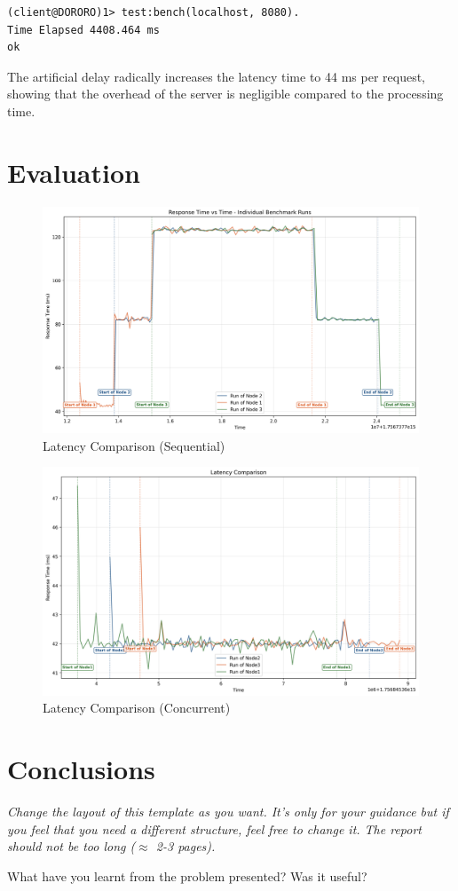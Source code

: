 \documentclass[a4paper, 11pt]{article}
\begin{document}
\begin{lstlisting}[style=erlang, caption={Benchmarking the sequential server with processing delay}]
(client@DORORO)1> test:bench(localhost, 8080).
Time Elapsed 4408.464 ms
ok
\end{lstlisting}

The artificial delay radically increases the latency time to 44 ms per request, showing that the overhead of the server is negligible compared to the processing time.

\section{Evaluation}

\begin{figure}[h]
  \centering
  \includegraphics[width=0.9\linewidth]{sequential_benches/latency_plot.png}
  \caption{Latency Comparison (Sequential)}
  \label{fig:latency_comparison_seq}
\end{figure}

\begin{figure}[h]
  \centering
  \includegraphics[width=0.9\linewidth]{concurrent_benches/latency_plot.png}
  \caption{Latency Comparison (Concurrent)}
  \label{fig:latency_comparison_conc}
\end{figure}


\section{Conclusions}

\textit{Change the layout of this template as you want. It's only for
  your guidance but if you feel that you need a different structure,
  feel free to change it. The report should not be too long ($\approx$
  2-3 pages).}

What have you learnt from the problem presented?
Was it useful?
\end{document}
